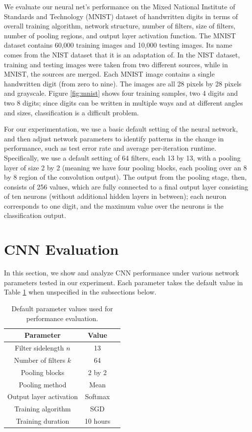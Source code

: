 \documentclass[10pt,twocolumn]{article}
\begin{document}
We evaluate our neural net's performance on the Mixed National Institute of Standards and Technology (MNIST) dataset of handwritten digits \cite{mnist} in terms of overall training algorithm, network structure, number of filters, size of filters, number of pooling regions, and output layer activation function. The MNIST dataset contains 60,000 training images and 10,000 testing images. Its name comes from the NIST dataset that it is an adaptation of. In the NIST dataset, training and testing images were taken from two different sources, while in MNIST, the sources are merged. Each MNIST image contains a single handwritten digit (from zero to nine). The images are all 28 pixels by 28 pixels and grayscale. Figure \ref{fig:mnist} shows four training samples, two 4 digits and two 8 digits; since digits can be written in multiple ways and at different angles and sizes, classification is a difficult problem.

For our experimentation, we use a basic default setting of the neural network, and then adjust network parameters to identify patterns in the change in performance, such as test error rate and average per-iteration runtime. Specifically, we use a default setting of 64 filters, each 13 by 13, with a pooling layer of size 2 by 2 (meaning we have four pooling blocks, each pooling over an 8 by 8 region of the convolution output). The output from the pooling stage, then, consists of 256 values, which are fully connected to a final output layer consisting of ten neurons (without additional hidden layers in between); each neuron corresponds to one digit, and the maximum value over the neurons is the classification output.

\section{CNN Evaluation}

In this section, we show and analyze CNN performance under various network parameters tested in our experiment. Each parameter takes the default value in Table \ref{table:evaldefault} when unspecified in the subsections below.

\begin{table}
\begin{center}
\begin{tabular}{| c | c | c |}
\hline
Parameter & Value \\
\hline \hline
Filter sidelength $n$ & 13 \\
\hline
Number of filters $k$ & 64 \\
\hline
Pooling blocks & 2 by 2 \\
\hline
Pooling method & Mean \\
\hline
Output layer activation & Softmax \\
\hline
Training algorithm & SGD \\
\hline
Training duration & 10 hours \\
\hline
\end{tabular}
\end{center}
\caption{Default parameter values used for performance evaluation.}
\label{table:evaldefault}
\end{table}
\end{document}
